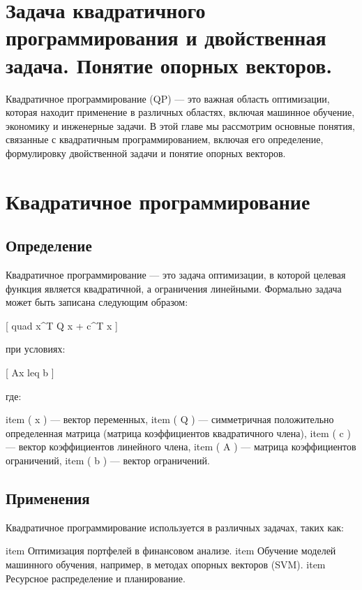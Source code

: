 \section{Задача квадратичного программирования и двойственная задача. Понятие опорных векторов.}

Квадратичное программирование (QP) — это важная область оптимизации, которая находит применение в различных областях, включая машинное обучение, экономику и инженерные задачи. В этой главе мы рассмотрим основные понятия, связанные с квадратичным программированием, включая его определение, формулировку двойственной задачи и понятие опорных векторов.

\section{Квадратичное программирование}

\subsection{Определение}

Квадратичное программирование — это задача оптимизации, в которой целевая функция является квадратичной, а ограничения линейными. Формально задача может быть записана следующим образом:

[
 quad  x^T Q x + c^T x
]

при условиях:

[
Ax leq b
]

где:
\begin{itemize}
    item ( x ) — вектор переменных,
    item ( Q ) — симметричная положительно определенная матрица (матрица коэффициентов квадратичного члена),
    item ( c ) — вектор коэффициентов линейного члена,
    item ( A ) — матрица коэффициентов ограничений,
    item ( b ) — вектор ограничений.
\end{itemize}

\subsection{Применения}

Квадратичное программирование используется в различных задачах, таких как:
\begin{itemize}
    item Оптимизация портфелей в финансовом анализе.
    item Обучение моделей машинного обучения, например, в методах опорных векторов (SVM).
    item Ресурсное распределение и планирование.
\end{itemize}

